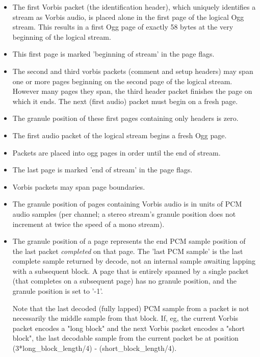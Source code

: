\begin{itemize}

\item
  The first Vorbis packet (the identification header), which
  uniquely identifies a stream as Vorbis audio, is placed alone in the
  first page of the logical Ogg stream.  This results in a first Ogg
  page of exactly 58 bytes at the very beginning of the logical stream.


\item
  This first page is marked 'beginning of stream' in the page flags.


\item
  The second and third vorbis packets (comment and setup
  headers) may span one or more pages beginning on the second page of
  the logical stream.  However many pages they span, the third header
  packet finishes the page on which it ends.  The next (first audio) packet
  must begin on a fresh page.


\item
  The granule position of these first pages containing only headers is zero.


\item
  The first audio packet of the logical stream begins a fresh Ogg page.


\item
  Packets are placed into ogg pages in order until the end of stream.


\item
  The last page is marked 'end of stream' in the page flags.


\item
  Vorbis packets may span page boundaries.


\item
  The granule position of pages containing Vorbis audio is in units
  of PCM audio samples (per channel; a stereo stream's granule position
  does not increment at twice the speed of a mono stream).


\item
  The granule position of a page represents the end PCM sample
  position of the last packet \emph{completed} on that
  page.  The 'last PCM sample' is the last complete sample returned by
  decode, not an internal sample awaiting lapping with a
  subsequent block.  A page that is entirely spanned by a single
  packet (that completes on a subsequent page) has no granule
  position, and the granule position is set to '-1'.


  Note that the last decoded (fully lapped) PCM sample from a packet
  is not necessarily the middle sample from that block. If, eg, the
  current Vorbis packet encodes a "long block" and the next Vorbis
  packet encodes a "short block", the last decodable sample from the
  current packet be at position (3*long\_block\_length/4) -
  (short\_block\_length/4).



\end{itemize}
